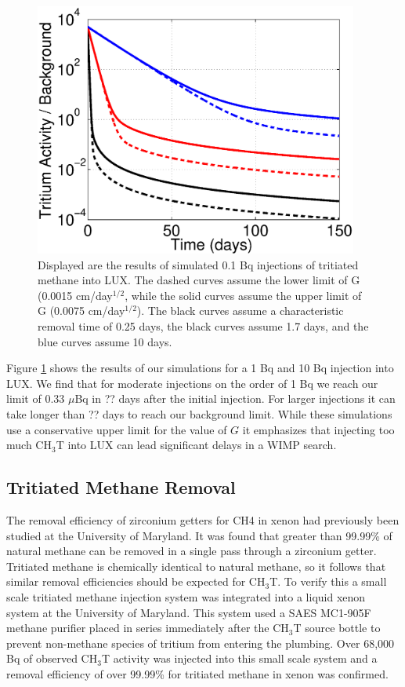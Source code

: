 \begin{figure}[h!]
\centering
\includegraphics[width=0.95\textwidth]{tau_G_var_CH3T.eps}
\caption{Displayed are the results of simulated 0.1 Bq injections of tritiated methane into LUX. The dashed curves assume the lower limit of G (0.0015 cm/day$^{1/2}$, while the solid curves assume the upper limit of G (0.0075 cm/day$^{1/2}$). The black curves assume a  characteristic removal time of 0.25 days, the black curves assume 1.7 days, and the blue curves assume 10 days.}
\label{fig:tau_var}
\end{figure}

Figure \ref{fig:tau_var} shows the results of our simulations for a 1 Bq and 10 Bq injection into LUX.  We find that for moderate injections on the order of 1 Bq we reach our limit of 0.33 $\mu$Bq in ?? days after the initial injection.  For larger injections it can take longer than ?? days to reach our background limit.  While these simulations use a conservative upper limit for the value of $G$ it emphasizes that injecting too much CH$_3$T into LUX can lead significant delays in a WIMP search.  


\subsection{Tritiated Methane Removal}
\label{sec:RD}

The removal efficiency of zirconium getters for CH4 in xenon had previously been studied at the University of Maryland.  It was found that greater than 99.99\% of natural methane can be removed in a single pass through a zirconium getter. \cite{Dobi_CH4} Tritiated methane is chemically identical to natural methane, so it follows that similar removal efficiencies should be expected for CH$_3$T.  To verify this a small scale tritiated methane injection system was integrated into a liquid xenon system at the University of Maryland.  This system used a SAES MC1-905F methane purifier placed in series immediately after the CH$_3$T source bottle to prevent non-methane species of tritium from entering the plumbing. Over 68,000 Bq of observed CH$_3$T activity was injected into this small scale system and a removal efficiency of over 99.99\% for tritiated methane in xenon was confirmed.

